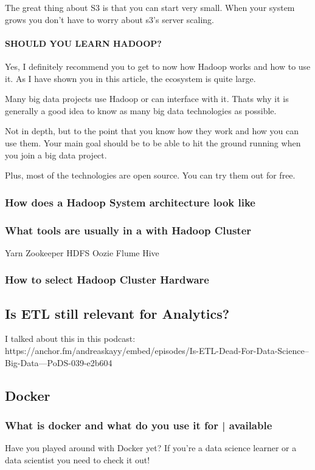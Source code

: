 \documentclass[12pt]{scrartcl} %
\begin{document}
The great thing about S3 is that you can start very small. When your system grows you don’t have to worry about s3’s server scaling.

\paragraph{SHOULD YOU LEARN HADOOP? }

Yes, I definitely recommend you to get to now how Hadoop works and how to use it. As I have shown you in this article, the ecosystem is quite large.

Many big data projects use Hadoop or can interface with it. Thats why it is generally a good idea to know as many big data technologies as possible.

Not in depth, but to the point that you know how they work and how you can use them. Your main goal should be to be able to hit the ground running when you join a big data project.

Plus, most of the technologies are open source. You can try them out for free.
\subsubsection{How does a Hadoop System architecture look like}
\subsubsection{What tools are usually in a with Hadoop Cluster}
Yarn
Zookeeper
HDFS
Oozie
Flume
Hive
\subsubsection{How to select Hadoop Cluster Hardware}

\subsection{Is ETL still relevant for Analytics?}
I talked about this in this podcast: https://anchor.fm/andreaskayy/embed/episodes/Is-ETL-Dead-For-Data-Science--Big-Data---PoDS-039-e2b604


\subsection{Docker}

\subsubsection{What is docker and what do you use it for | available}
Have you played around with Docker yet? If you’re a data science learner or a data scientist you need to check it out!
\end{document}

